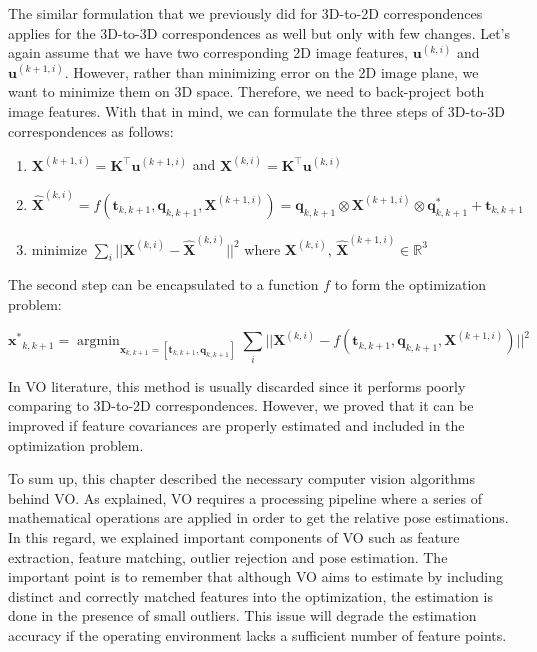 \documentclass[a4paper]{report}
\numberwithin{figure}{section}
\newcommand{\argmin}{\mathop{\mathrm{argmin}}}
\newcommand{\R}{\mathbb{R}}
\begin{document}
The similar formulation that we previously did for 3D-to-2D correspondences 
applies for the 3D-to-3D correspondences as well but only with few changes. 
Let's again assume that we have two corresponding 2D image features, 
$\mathbf{u}^{(k,i)}$ and $\mathbf{u}^{(k+1,i)}$. However, rather than 
minimizing error on the 2D image plane, we want to minimize them on 3D space. 
Therefore, we need to back-project both image features. With that in mind, we 
can formulate the three steps of 3D-to-3D correspondences as follows:

\begin{enumerate}
  \item $\mathbf{X}^{(k+1,i)} = \mathbf{K}^\top \mathbf{u}^{(k+1,i)}$ and 
    $\mathbf{X}^{(k,i)} = \mathbf{K}^\top \mathbf{u}^{(k,i)}$ 
  \item $\mathbf{\hat{X}}^{(k,i)} = f(\mathbf{t}_{k,k+1}, \mathbf{q}_{k,k+1}, 
  \mathbf{X}^{(k+1,i)}) = 
    \mathbf{q}_{k,k+1} \otimes \mathbf{X}^{(k+1,i)} \otimes 
    \mathbf{q}_{k,k+1}^* + \mathbf{t}_{k,k+1}$
  \item minimize $\sum_i||\mathbf{X}^{(k,i)} - \mathbf{\hat{X}}^{(k,i)}||^2$ 
  where $\mathbf{X}^{(k,i)}$, $\mathbf{\hat{X}}^{(k+1,i)} \in \R^3$

\end{enumerate}

The second step can be encapsulated to a function $f$ to form the optimization 
problem:

\begin{equation}
  \mathbf{x^*}_{k,k+1} = \argmin_{\mathbf{x}_{k,k+1} = [\mathbf{t}_{k,k+1}, 
  	\mathbf{q}_{k,k+1}]}
  \sum_i||\mathbf{X}^{(k,i)} - f(\mathbf{t}_{k,k+1}, \mathbf{q}_{k,k+1}, 
  \mathbf{X}^{(k+1,i)})||^2
\end{equation}\label{eq:3d_to_3d_rel_pose_est}

In VO literature, this method is usually discarded since it performs poorly 
comparing to 3D-to-2D correspondences. However, we proved that it can be 
improved if feature covariances are properly estimated and included in the 
optimization problem.

To sum up, this chapter described the necessary computer vision
algorithms behind VO. As explained, VO requires a processing pipeline 
where a series of mathematical operations are applied in order to get 
the relative pose estimations. In this regard, we explained important 
components of VO such as feature extraction, feature matching, outlier rejection 
and pose estimation. The important point is to remember that 
although VO aims to estimate by including distinct and correctly matched 
features into the optimization, the estimation is done in the presence of 
small outliers. This issue will degrade the estimation accuracy 
if the operating environment lacks a sufficient number of feature points.
\end{document}
